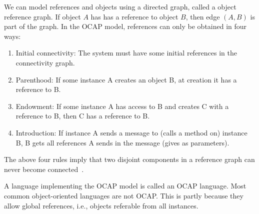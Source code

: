 We can model references and objects using a directed graph, called a object reference
graph. If object $A$ has has a reference to object $B$, then edge $(A, B)$ is
part of the graph.  In the OCAP model, references can only be obtained in four
ways:
\begin{enumerate}
  \item Initial connectivity: The system must have some initial references in
    the connectivity graph.
  \item Parenthood: If some instance A creates an object B, at creation it has
    a reference to B.
  \item Endowment: If some instance A has access to B and creates C with a
    reference to B, then C has a reference to B.
  \item Introduction: If instance A sends a message to (calls a method on)
    instance B, B gets all references A sends in the message (gives as
    parameters).
\end{enumerate}
 The above four rules imply that two disjoint components in a reference graph
 can never become connected~\parencite{Miller06b}.

A language implementing the OCAP model is called an OCAP language. Most common
object-oriented languages are not OCAP. This is partly because they allow global
references, i.e., objects referable from all instances.

